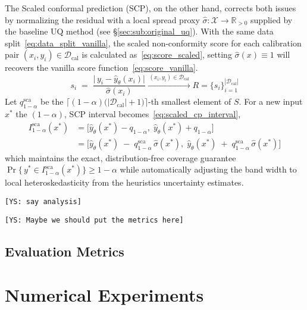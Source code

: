 \documentclass[preprint,12pt]{elsarticle}
\newcommand{\cys}[1]{{\small \color{blue} \tt [YS: #1]}}
\begin{document}
The Scaled conformal prediction (SCP), on the other hand, corrects both issues by normalizing the residual with a local spread proxy $\hat\sigma:\mathcal X\!\to\!\mathbb R_{>0}$ supplied by the baseline UQ method (see \S\ref{sec:sub:original_uq}). With the same data split~\eqref{eq:data_split_vanilla}, the scaled non-conformity score for each calibration pair $(x_i,y_i)\in\mathcal D_{\mathrm{cal}}$ is calculated as~\eqref{eq:score_scaled}, setting $\hat\sigma(x)\equiv 1$ will recovers the vanilla score function~\eqref{eq:score_vanilla}. 
\begin{equation}
  s_i \;=\;
    \frac{\bigl|\,y_i - \hat y_{\theta}(x_i)\bigr|}
        {\hat\sigma(x_i)}
    \xrightarrow{\,(x_i,y_i)\in\mathcal D_{\mathrm{cal}}\,}
    R = \{s_i\}_{i=1}^{|\mathcal D_{\mathrm{cal}}|}
\label{eq:score_scaled}
\end{equation}
Let $q^{\mathrm{sca}}_{1-\alpha}$ be the $\bigl\lceil (1-\alpha)\bigl(|\mathcal D_{\mathrm{cal}}|+1\bigr)\bigr\rceil$-th smallest element of $S$. For a new input $x^\ast$ the $(1-\alpha)$, SCP interval becomes~\eqref{eq:scaled_cp_interval}, 
\begin{equation}
\begin{aligned}
    I^{\mathrm{sca}}_{1-\alpha}(x^\ast)
    &=
    \bigl[
        \hat y_{\theta}(x^\ast) - q_{1-\alpha},\;
        \hat y_{\theta}(x^\ast) + q_{1-\alpha}
    \bigr]\\
    &=
    \bigl[
        \hat y_{\theta}(x^\ast) \;-\; q^{\mathrm{sca}}_{1-\alpha}\,\hat\sigma(x^\ast),\;
        \hat y_{\theta}(x^\ast) \;+\; q^{\mathrm{sca}}_{1-\alpha}\,\hat\sigma(x^\ast)
    \bigr]
\label{eq:scaled_cp_interval}
\end{aligned}
\end{equation}
which maintains the exact, distribution-free coverage guarantee $\Pr\!\bigl\{\,y^\ast\in I^{\mathrm{sca}}_{1-\alpha}(x^\ast)\bigr\}\ge 1-\alpha$ while automatically adjusting the band width to local heteroskedasticity from the heuristics uncertainty estimates.

\cys{say analysis}

\cys{Maybe we should put the metrics here}

\subsection{Evaluation Metrics}
\label{sec:metrics}

\section{Numerical Experiments}
\label{sec:numerics}
\end{document}
